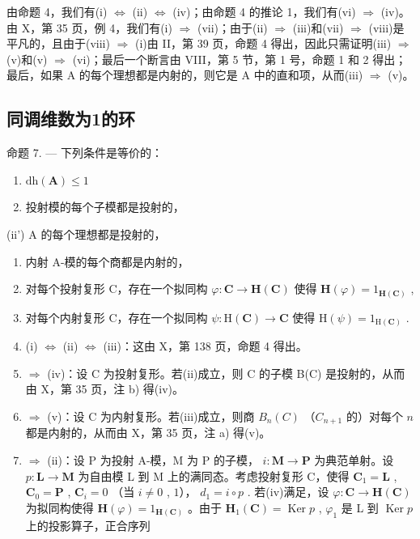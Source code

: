 由命题 4，我们有(i) \(\Leftrightarrow\) (ii) \(\Leftrightarrow\) (iv)；由命题 4 的推论 1，我们有(vi) \(\Rightarrow\) (iv)。由 X，第 35 页，例 4，我们有(i) \(\Rightarrow\) (vii)；由于(ii) \(\Rightarrow\) (iii)和(vii) \(\Rightarrow\) (viii)是平凡的，且由于(viii) \(\Rightarrow\) (i)由 II，第 39 页，命题 4 得出，因此只需证明(iii) \(\Rightarrow\) (v)和(v) \(\Rightarrow\) (vi)；最后一个断言由 VIII，第 5 节，第 1 号，命题 1 和 2 得出；最后，如果 A 的每个理想都是内射的，则它是 A 中的直和项，从而(iii) \(\Rightarrow\) (v)。

\subsection{同调维数为1的环}

命题 7. --- 下列条件是等价的：

\begin{enumerate}
\def\labelenumi{(\roman{enumi})}
\item
  \(\mathrm{dh}(\mathbf{A})\leqslant 1\)
\item
  投射模的每个子模都是投射的，
\end{enumerate}

(ii') A 的每个理想都是投射的，

\begin{enumerate}
\def\labelenumi{(\roman{enumi})}
\setcounter{enumi}{2}
\item
  内射 A-模的每个商都是内射的，
\item
  对每个投射复形 C，存在一个拟同构 \(\varphi : \mathbf{C} \to \mathbf{H}(\mathbf{C})\) 使得 \(\mathbf{H}(\varphi) = 1_{\mathbf{H}(\mathbf{C})}\) ,
\item
  对每个内射复形 C，存在一个拟同构 \(\psi : \mathrm{H}(\mathbf{C}) \to \mathbf{C}\) 使得 \(\mathrm{H}(\psi) = 1_{\mathrm{H}(\mathbf{C})}\) .
\item
  (i) \(\Leftrightarrow\) (ii) \(\Leftrightarrow\) (iii)：这由 X，第 138 页，命题 4 得出。
\item
  \(\Rightarrow\) (iv)：设 C 为投射复形。若(ii)成立，则 C 的子模 B(C) 是投射的，从而由 X，第 35 页，注 b) 得(iv)。
\item
  \(\Rightarrow\) (v)：设 C 为内射复形。若(iii)成立，则商 \(B_{n}(C)\) （\(C_{n+1}\) 的）对每个 \(n\) 都是内射的，从而由 X，第 35 页，注 a) 得(v)。
\item
  \(\Rightarrow\) (ii)：设 P 为投射 A-模，M 为 P 的子模， \(i: \mathbf{M} \to \mathbf{P}\) 为典范单射。设 \(p: \mathbf{L} \to \mathbf{M}\) 为自由模 L 到 M 上的满同态。考虑投射复形 C，使得 \(\mathbf{C}_1 = \mathbf{L}\) , \(\mathbf{C}_0 = \mathbf{P}\) , \(\mathbf{C}_i = 0\) （当 \(i \neq 0\) , \(1\)）， \(d_1 = i \circ p\) . 若(iv)满足，设 \(\varphi: \mathbf{C} \to \mathbf{H}(\mathbf{C})\) 为拟同构使得 \(\mathbf{H}(\varphi) = 1_{\mathbf{H}(\mathbf{C})}\) 。由于 \(\mathbf{H}_1(\mathbf{C}) = \operatorname{Ker} p\) , \(\varphi_1\) 是 L 到 \(\operatorname{Ker} p\) 上的投影算子，正合序列
\end{enumerate}

